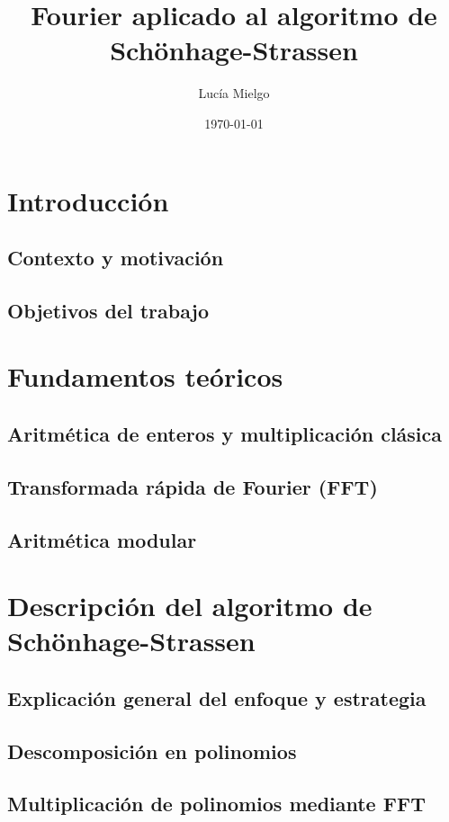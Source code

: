 \documentclass{article}
\title{Fourier aplicado al algoritmo de Schönhage-Strassen}
\author{Lucía Mielgo}
\date{\today}
\begin{document}
\maketitle

\newpage
\tableofcontents

\section{Introducción}
    \subsection{Contexto y motivación}
    \subsection{Objetivos del trabajo}
    
\section{Fundamentos teóricos}
    \subsection{Aritmética de enteros y multiplicación clásica}
    \subsection{Transformada rápida de Fourier (FFT)}
    \subsection{Aritmética modular}
    
\section{Descripción del algoritmo de Schönhage-Strassen}
    \subsection{Explicación general del enfoque y estrategia}
    \subsection{Descomposición en polinomios}
    \subsection{Multiplicación de polinomios mediante FFT}
\end{document}
